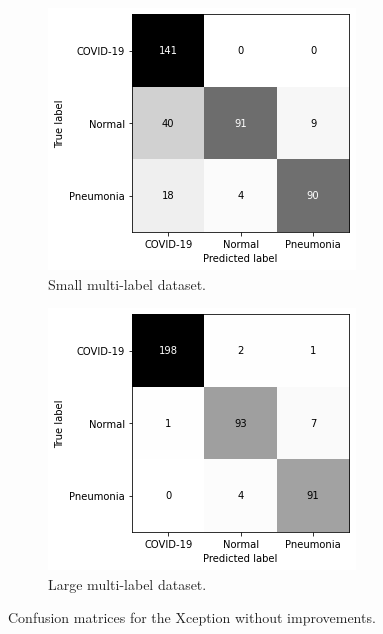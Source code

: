\begin{figure}
    \begin{subfigure}[b]{0.49\textwidth}
        \centering
        \includegraphics[width=\textwidth]{figures/cm-no-improv-s-m.png}
        \caption{Small multi-label dataset.}
        \label{fig:cm-n-improv-s-m}
    \end{subfigure}
    \hfill
    \begin{subfigure}[b]{0.49\textwidth}
        \centering
        \includegraphics[width=\textwidth]{figures/cm-no-improv-l-m.png}
        \caption{Large multi-label dataset.}
        \label{fig:cm-n-improv-l-m}
    \end{subfigure}
    \caption{Confusion matrices for the Xception without improvements.}
    \label{fig:cm-no-improv}
\end{figure}

